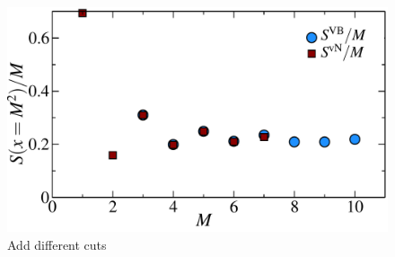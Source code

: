 \begin{figure} {
	\centering
	\includegraphics[width=5in]{./figures/made/marea.pdf} 
	\caption[fds]{ Add different cuts
	\label{2Dbetter}
	}
} \end{figure}
